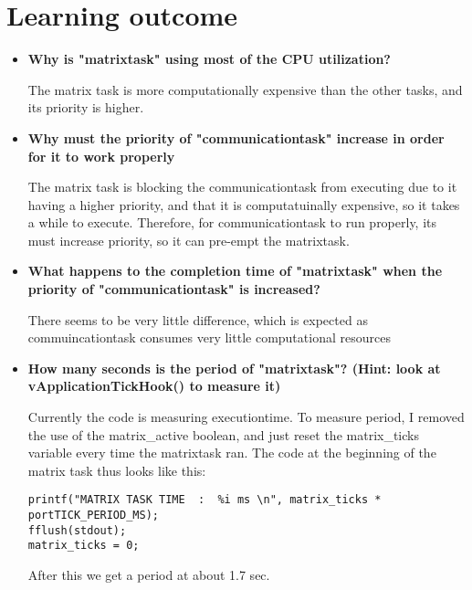 \documentclass[12pt,fleqn,leqno,letterpaper]{article}
\begin{document}
    \section*{Learning outcome}
        \begin{itemize}
            \item \textbf{Why is "matrixtask" using most of the CPU utilization?}

        The matrix task is more computationally expensive than the other tasks, and its priority is higher.

            \item \textbf{Why must the priority of "communicationtask" increase in order for it to work properly}

        The matrix task is blocking the communicationtask from executing due to it having a higher priority, and that it is
        computatuinally expensive, so it takes a while to execute. Therefore, for communicationtask to run properly, its must
        increase priority, so it can pre-empt the matrixtask.

            \item \textbf{What happens to the completion time of "matrixtask" when the priority of "communicationtask" is increased?}

        There seems to be very little difference, which is expected as commuincationtask consumes very little computational resources

            \item \textbf{How many seconds is the period of "matrixtask"? (Hint: look at vApplicationTickHook() to measure it)}

        Currently the code is measuring executiontime.  To measure period, I removed the use of the matrix\_active boolean, and just reset the
        matrix\_ticks variable every time the matrixtask ran.  The code at the beginning of the matrix task thus looks like this:

        \begin{verbatim}
printf("MATRIX TASK TIME  :  %i ms \n", matrix_ticks * portTICK_PERIOD_MS);
fflush(stdout);
matrix_ticks = 0;
        \end{verbatim}

        After this we get a period at about 1.7 sec.

        \end{itemize}

    
\end{document}
